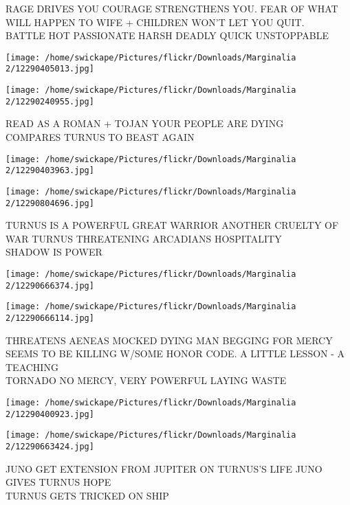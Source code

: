 \documentclass[10pt,letterpaper]{article}
\begin{document}
RAGE DRIVES YOU COURAGE STRENGTHENS YOU. FEAR OF WHAT WILL HAPPEN TO WIFE + CHILDREN WON'T LET YOU QUIT.\\
BATTLE HOT PASSIONATE HARSH DEADLY QUICK UNSTOPPABLE\\
\pagebreak

\texttt{[image: /home/swickape/Pictures/flickr/Downloads/Marginalia 2/12290405013.jpg]}

\vspace{0.25in}
\texttt{[image: /home/swickape/Pictures/flickr/Downloads/Marginalia 2/12290240955.jpg]}

READ AS A ROMAN + TOJAN YOUR PEOPLE ARE DYING\\
COMPARES TURNUS TO BEAST AGAIN\\
\pagebreak

\texttt{[image: /home/swickape/Pictures/flickr/Downloads/Marginalia 2/12290403963.jpg]}

\vspace{0.25in}
\texttt{[image: /home/swickape/Pictures/flickr/Downloads/Marginalia 2/12290804696.jpg]}

TURNUS IS A POWERFUL GREAT WARRIOR ANOTHER CRUELTY OF WAR TURNUS THREATENING ARCADIANS HOSPITALITY\\
SHADOW IS POWER\\
\pagebreak

\texttt{[image: /home/swickape/Pictures/flickr/Downloads/Marginalia 2/12290666374.jpg]}

\vspace{0.25in}
\texttt{[image: /home/swickape/Pictures/flickr/Downloads/Marginalia 2/12290666114.jpg]}

THREATENS AENEAS MOCKED DYING MAN BEGGING FOR MERCY SEEMS TO BE KILLING W/SOME HONOR CODE. A LITTLE LESSON {-} A TEACHING\\
TORNADO NO MERCY, VERY POWERFUL LAYING WASTE\\
\pagebreak

\texttt{[image: /home/swickape/Pictures/flickr/Downloads/Marginalia 2/12290400923.jpg]}

\vspace{0.25in}
\texttt{[image: /home/swickape/Pictures/flickr/Downloads/Marginalia 2/12290663424.jpg]}

JUNO GET EXTENSION FROM JUPITER ON TURNUS'S LIFE JUNO GIVES TURNUS HOPE\\
TURNUS GETS TRICKED ON SHIP\\
\pagebreak
\end{document}
